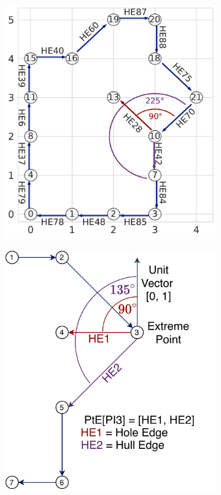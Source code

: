 \begin{figure}[ht]
    \centering
  \begin{subfigure}[t]{.25\linewidth}
    \centering
    \includegraphics[width=0.99\linewidth]{chapter_2_polylidar/imgs/example_one_hole_choice_visual.pdf}
    \caption{}
    \label{fig:ch2_example1_non_extreme}
  \end{subfigure}
  \begin{subfigure}[t]{.23\linewidth}
    \centering
     \includegraphics[width=.99\linewidth]{chapter_2_polylidar/imgs/EdgeHole.pdf}

\end{subfigure}
\end{figure}
